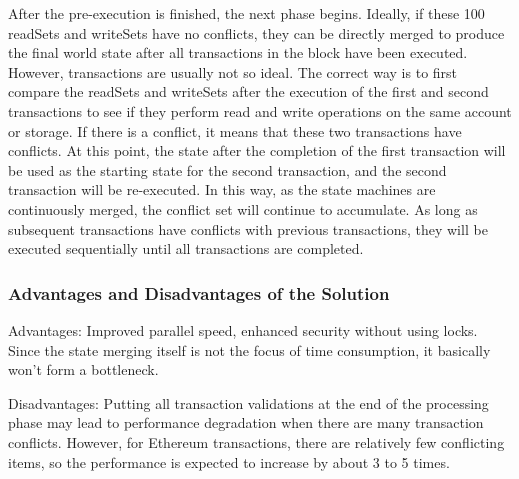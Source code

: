 After the pre-execution is finished, the next phase begins. Ideally, if these 100 readSets and writeSets have no conflicts, they can be directly merged to produce the final world state after all transactions in the block have been executed. However, transactions are usually not so ideal. The correct way is to first compare the readSets and writeSets after the execution of the first and second transactions to see if they perform read and write operations on the same account or storage. If there is a conflict, it means that these two transactions have conflicts. At this point, the state after the completion of the first transaction will be used as the starting state for the second transaction, and the second transaction will be re-executed. In this way, as the state machines are continuously merged, the conflict set will continue to accumulate. As long as subsequent transactions have conflicts with previous transactions, they will be executed sequentially until all transactions are completed.

\subsubsection{Advantages and Disadvantages of the Solution}

Advantages: Improved parallel speed, enhanced security without using locks. Since the state merging itself is not the focus of time consumption, it basically won't form a bottleneck.

Disadvantages: Putting all transaction validations at the end of the processing phase may lead to performance degradation when there are many transaction conflicts. However, for Ethereum transactions, there are relatively few conflicting items, so the performance is expected to increase by about 3 to 5 times.